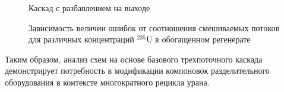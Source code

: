 \begin{figure}[ht]
  \caption{Каскад с разбавлением на выходе}\label{fig:Terminal_Dilution}
\end{figure}

\begin{figure}[ht]
  \caption{Зависимость величин ошибок от соотношения смешиваемых потоков для различных концентраций  $^{235}$U в обогащенном регенерате}\label{fig:TerminalDilution_results}
\end{figure}


Таким образом, анализ схем на основе базового трехпоточного каскада демонстрирует потребность в модификации компоновок разделительного оборудования в контексте многократного рецикла урана.

